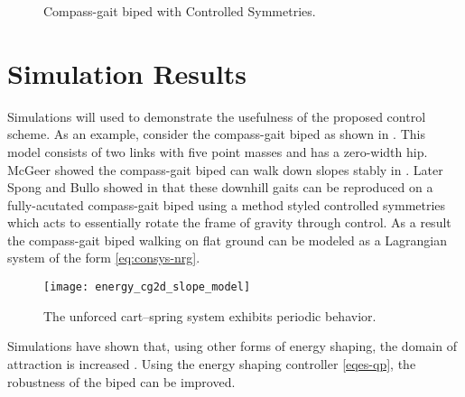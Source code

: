 \begin{figure}
  \centering
  \def\svgwidth{0.5\columnwidth}
  
  \caption{Compass-gait biped with Controlled Symmetries.}
  \label{fig:cg2d-model}
\end{figure}

\section*{Simulation Results}

Simulations will used to demonstrate the usefulness of the proposed control scheme.
%
As an example, consider the compass-gait biped as shown in .
%
This model consists of two links with five point masses and has a zero-width hip.
%
McGeer showed the compass-gait biped can walk down slopes stably in \cite{McGeer90}.
%
Later Spong and Bullo showed in \cite{SB02} that these downhill gaits can be reproduced on a fully-acutated compass-gait biped using a method styled controlled symmetries which acts to essentially rotate the frame of gravity through control.
%
As a result the compass-gait biped walking on flat ground can be modeled as a Lagrangian system of the form \eqref{eq:consys-nrg}.

\begin{figure}
  \centering
  \texttt{[image: energy\_cg2d\_slope\_model]}
  \caption{The unforced cart--spring system exhibits periodic behavior.}
\end{figure}

Simulations have shown that, using other forms of energy shaping, the domain of attraction is increased \cite{SpBh03}.
%
Using the energy shaping controller \eqref{eqes-qp}, the robustness of the biped can be improved.
%
